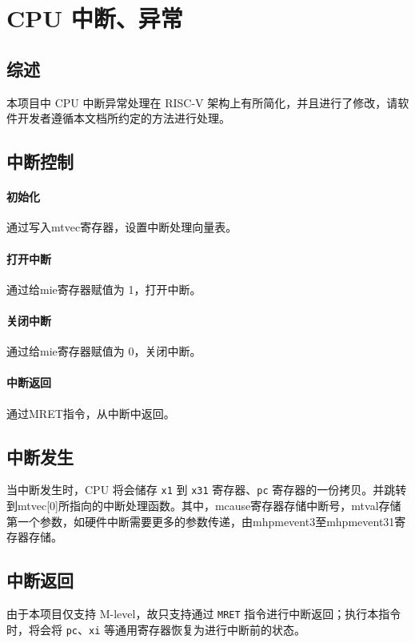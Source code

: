 
\chapter{CPU 中断、异常}

\section{综述}
本项目中 CPU 中断异常处理在 RISC-V 架构上有所简化，并且进行了修改，请软件开发者遵循本文档所约定的方法进行处理。

\section{中断控制}

\subsubsection{初始化}
通过写入mtvec寄存器，设置中断处理向量表。

\subsubsection{打开中断}
通过给mie寄存器赋值为 1，打开中断。

\subsubsection{关闭中断}
通过给mie寄存器赋值为 0，关闭中断。

\subsubsection{中断返回}
通过MRET指令，从中断中返回。

\section{中断发生}

当中断发生时，CPU 将会储存 \texttt{x1} 到 \texttt{x31} 寄存器、\texttt{pc} 寄存器的一份拷贝。并跳转到mtvec[0]所指向的中断处理函数。其中，mcause寄存器存储中断号，mtval存储第一个参数，如硬件中断需要更多的参数传递，由mhpmevent3至mhpmevent31寄存器存储。

\section{中断返回}

由于本项目仅支持 M-level，故只支持通过 \texttt{MRET} 指令进行中断返回；执行本指令时，将会将 \texttt{pc}、\texttt{xi} 等通用寄存器恢复为进行中断前的状态。

